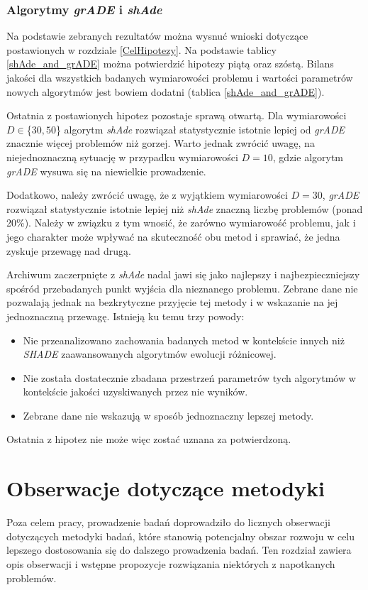 \documentclass[12pt,a4paper]{report}
\begin{document}
{{{{{{{\subsection{Algorytmy \emph{grADE} i \emph{shAde}}
\par{
Na podstawie zebranych rezultatów można wysnuć wnioski dotyczące postawionych w rozdziale \ref{CelHipotezy}. Na podstawie tablicy \ref{shAde_and_grADE} można potwierdzić hipotezy piątą oraz szóstą. Bilans jakości dla wszystkich badanych wymiarowości problemu i wartości parametrów nowych algorytmów jest bowiem dodatni (tablica \ref{shAde_and_grADE}).
}
\par{
Ostatnia z postawionych hipotez pozostaje sprawą otwartą. Dla wymiarowości $D \in $\{$30, 50$\} algorytm \emph{shAde} rozwiązał statystycznie istotnie lepiej od \emph{grADE} znacznie więcej problemów niż gorzej. Warto jednak zwrócić uwagę, na niejednoznaczną sytuację w przypadku wymiarowości $D = 10$, gdzie algorytm \emph{grADE} wysuwa się na niewielkie prowadzenie.
}
\par{
Dodatkowo, należy zwrócić uwagę, że z wyjątkiem wymiarowości $D = 30$, \emph{grADE} rozwiązał statystycznie istotnie lepiej niż \emph{shAde} znaczną liczbę problemów (ponad 20\%). Należy w związku z tym wnosić, że zarówno wymiarowość problemu, jak i jego charakter może wpływać na skuteczność obu metod i sprawiać, że jedna zyskuje przewagę nad drugą.
}
\par{
Archiwum zaczerpnięte z \emph{shAde} nadal jawi się jako najlepszy i najbezpieczniejszy spośród przebadanych punkt wyjścia dla nieznanego problemu. Zebrane dane nie pozwalają jednak na bezkrytyczne przyjęcie tej metody i w wskazanie na jej jednoznaczną przewagę. Istnieją ku temu trzy powody:
\begin{itemize}
\item Nie przeanalizowano zachowania badanych metod w kontekście innych niż \emph{SHADE} zaawansowanych algorytmów ewolucji różnicowej.
\item Nie została dostatecznie zbadana przestrzeń parametrów tych algorytmów w kontekście jakości uzyskiwanych przez nie wyników.
\item Zebrane dane nie wskazują w sposób jednoznaczny lepszej metody.
\end{itemize}
}
\par{
Ostatnia z hipotez nie może więc zostać uznana za potwierdzoną.
}


\chapter{Obserwacje dotyczące metodyki}
\label{metodyka}
\par{
Poza celem pracy, prowadzenie badań doprowadziło do licznych obserwacji dotyczących metodyki badań, które stanowią potencjalny obszar rozwoju w celu lepszego dostosowania się do dalszego prowadzenia badań. Ten rozdział zawiera opis obserwacji i wstępne propozycje rozwiązania niektórych z napotkanych problemów.
}
}}}}}}}
\end{document}
